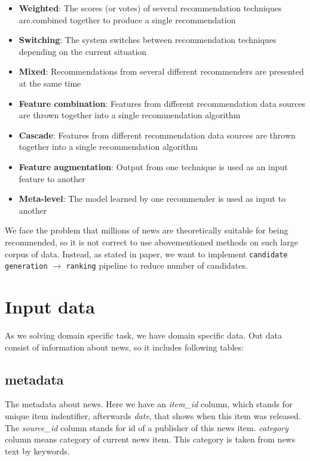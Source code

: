 \documentclass{article}
\begin{document}
\begin{itemize}
    \item \textbf{Weighted}: The scores (or votes) of several recommendation techniques are.combined together to produce a single recommendation
    \item \textbf{Switching}: The system switches between recommendation techniques depending on the current situation
    \item \textbf{Mixed}: Recommendations from several different recommenders are presented at the same time
    \item \textbf{Feature combination}: Features from different recommendation data sources are thrown together into a single recommendation algorithm
    \item \textbf{Cascade}: Features from different recommendation data sources are thrown together into a single recommendation algorithm 
    \item \textbf{Feature augmentation}: Output from one technique is used as an input feature to another
    \item \textbf{Meta-level}: The model learned by one recommender is used as input to another
\end{itemize}


We face the problem that millions of news are theoretically suitable for being recommended, so it is not correct to use abovementioned methods on such large corpus of data. Instead, as stated in \citep{youtube} paper, we want to implement \texttt{candidate generation} $\to$ \texttt{ranking} pipeline to reduce number of candidates.


\section{Input data}
\label{sec:input}

As we solving domain specific task, we have domain specific data.
Out data consist of information about news, so it includes following tables:

\subsection*{metadata}

The metadata about news. Here we have an \textit{item\_id} column, which stands for unique item indentifier, afterwards \textit{date}, that shows when this item was released. The \textit{source\_id} column stands for id of a publisher of this news item. \textit{category} column means category of current news item. This category is taken from news text by keywords.
\end{document}
